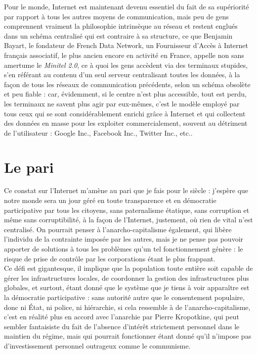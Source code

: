 \documentclass[12pt,a4paper]{article}
\begin{document}
{Pour le monde, Internet est maintenant devenu essentiel du fait de sa supériorité par rapport à tous les autres moyens de communication, mais peu de gens comprennent vraiment la philosophie intrinsèque au réseau et restent englués dans un schéma centralisé qui est contraire à sa structure, ce que Benjamin Bayart, le fondateur de French Data Network, un Fournisseur d'Accès à Internet français associatif, le plus ancien encore en activité en France, appelle non sans amertume le \emph{Minitel 2.0}, ce à quoi les gens accèdent via des terminaux stupides, s'en référant au contenu d'un seul serveur centralisant toutes les données, à la façon de tous les réseaux de communication précédents, selon un schéma obsolète et peu fiable : car, évidemment, si le centre n'est plus accessible, tout est perdu, les terminaux ne savent plus agir par eux-mêmes, c’est le modèle employé par tous ceux qui se sont considérablement enrichi grâce à Internet et qui collectent des données en masse pour les exploiter commercialement, souvent au détriment de l’utilisateur : Google Inc., Facebook Inc., Twitter Inc., etc..\\

\part{Le pari}

Ce constat sur l'Internet m'amène au pari que je fais pour le siècle : j'espère que notre monde sera un jour géré en toute transparence et en démocratie participative par tous les citoyens, sans paternalisme étatique, sans corruption et même sans corruptibilité, à la façon de l'Internet, justement, où rien de vital n'est centralisé. On pourrait penser à l’anarcho-capitalisme également, qui libère l’individu de la contrainte imposée par les autres, mais je ne pense pas pouvoir apporter de solutions à tous les problèmes qu’un tel fonctionnement génère : le risque de prise de contrôle par les corporations étant le plus frappant.\\

Ce défi est gigantesque, il implique que la population toute entière soit capable de gérer les infrastructures locales, de coordonner la gestion des infrastructures plus globales, et surtout, étant donné que le système que je tiens à voir apparaître est la démocratie participative : sans autorité autre que le consentement populaire, donc ni État, ni police, ni hiérarchie, si cela ressemble à de l’anarcho-capitalisme, c’est en réalité plus en accord avec l’anarchie par Pierre Kropotkine, qui peut sembler fantaisiste du fait de l’absence d’intérêt strictement personnel dans le maintien du régime, mais qui pourrait fonctionner étant donné qu’il n’impose pas d’investissement personnel outrageux comme le communisme.\\

}
\end{document}
